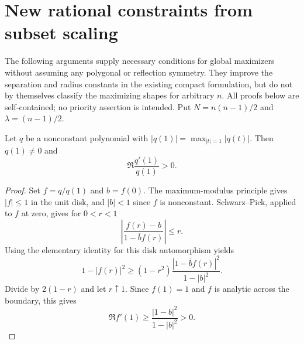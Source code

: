 \section{New rational constraints from subset scaling}
\label{sec:subset-scaling-new}

The following arguments supply necessary conditions for global maximizers
without assuming any polygonal or reflection symmetry. They improve the
separation and radius constants in the existing compact formulation, but
do not by themselves classify the maximizing shapes for arbitrary $n$.
All proofs below are self-contained; no priority assertion is intended.
Put $N=n(n-1)/2$ and $\lambda=(n-1)/2$.

\begin{lemma}\label{lem:boundary-derivative-new}
Let $q$ be a nonconstant polynomial with
$|q(1)|=\max_{|t|=1}|q(t)|$. Then $q(1)\ne0$ and
\[
                 \Re\frac{q'(1)}{q(1)}>0.
\]
\end{lemma}
\begin{proof}
Set $f=q/q(1)$ and $b=f(0)$. The maximum-modulus principle gives
$|f|\le1$ in the unit disk, and $|b|<1$ since $f$ is nonconstant.
Schwarz--Pick, applied to $f$ at zero, gives for $0<r<1$
\[
 \left|\frac{f(r)-b}{1-\overline b f(r)}\right|\le r.
\]
Using the elementary identity for this disk automorphism yields
\[
 1-|f(r)|^2\ge
 (1-r^2)\frac{|1-\overline b f(r)|^2}{1-|b|^2}.
\]
Divide by $2(1-r)$ and let $r\uparrow1$. Since $f(1)=1$ and $f$
is analytic across the boundary, this gives
\[
 \Re f'(1)\ge\frac{|1-b|^2}{1-|b|^2}>0.
\]
\end{proof}

